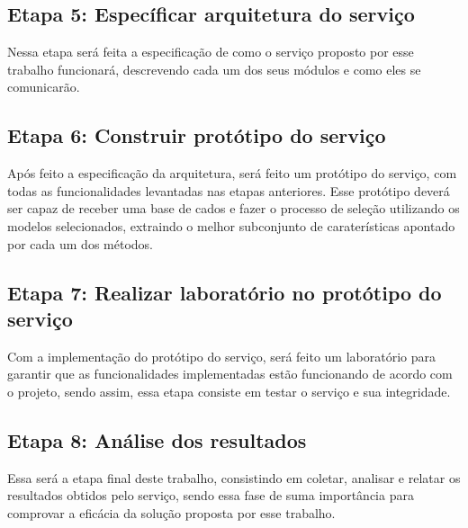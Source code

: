 \subsection{Etapa 5: Específicar arquitetura do serviço}

Nessa etapa será feita a especificação de como o serviço proposto por esse trabalho funcionará, descrevendo cada um dos seus módulos e como eles se comunicarão.

\subsection{Etapa 6: Construir protótipo do serviço}

Após feito a especificação da arquitetura, será feito um protótipo do serviço, com todas as funcionalidades levantadas nas etapas anteriores. Esse protótipo deverá ser capaz de receber uma base de cados e fazer o processo de seleção utilizando os modelos selecionados, extraindo o melhor subconjunto de caraterísticas apontado por cada um dos métodos.

\subsection{Etapa 7: Realizar laboratório no protótipo do serviço}
Com a implementação do protótipo do serviço, será feito um laboratório para garantir que as funcionalidades implementadas estão funcionando de acordo com o projeto, sendo assim, essa etapa consiste em testar o serviço e sua integridade.

\subsection{Etapa 8: Análise dos resultados}

Essa será a etapa final deste trabalho, consistindo em coletar, analisar e relatar os resultados obtidos pelo serviço, sendo essa fase de suma importância para comprovar a eficácia da solução proposta por esse trabalho.
